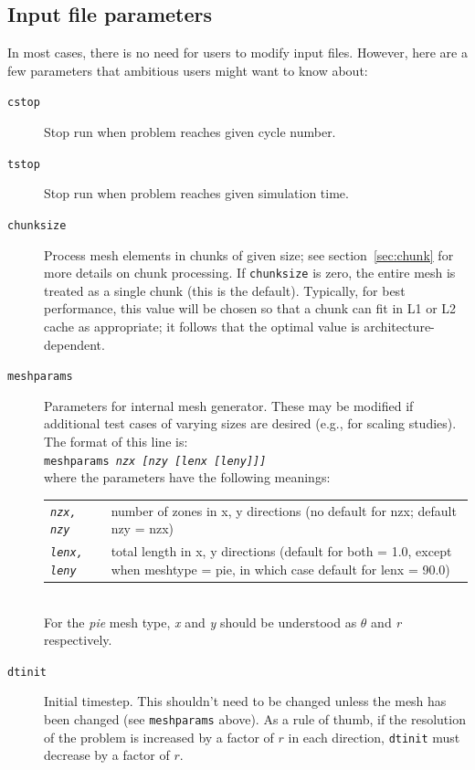 \documentclass[11pt,letterpaper]{article}
\begin{document}
\subsection{Input file parameters}

In most cases, there is no need for users to modify input files.  However,
here are a few parameters that ambitious users might want to know about:
\begin{description}
    \item[{\tt cstop}]  Stop run when problem reaches given cycle number.
    \item[{\tt tstop}]  Stop run when problem reaches given simulation time.
    \item[{\tt chunksize}]  Process mesh elements in chunks of given size;
        see section~\ref{sec:chunk} for more details on chunk processing.
        If {\tt chunksize} is zero, the entire mesh is
        treated as a single chunk (this is the default).
        Typically, for best performance, this value will be chosen so
        that a chunk can fit in L1 or L2 cache as appropriate; it
        follows that the optimal value is architecture-dependent.
    \item[{\tt meshparams}]  Parameters for internal mesh generator.
        These may be modified if additional test cases of varying sizes are
        desired (e.g., for scaling studies).  The format of this line
        is: \\
        {\tt meshparams \emph{nzx [nzy [lenx [leny]]]}} \\
        where the parameters have the following meanings: \\
        \begin{tabular}{lp{320pt}}
            {\tt\emph{nzx, nzy}} &
            number of zones in x, y directions
            (no default for nzx; default nzy = nzx) \\
            {\tt\emph{lenx, leny}} &
            total length in x, y directions
            (default for both = 1.0, except when meshtype = pie,
            in which case default for lenx = 90.0)
        \end{tabular} \\
        For the {\em pie} mesh type, {\em x} and {\em y}
        should be understood as $\theta$ and {\em r} respectively.
    \item[{\tt dtinit}]  Initial timestep.  This shouldn't need to be
        changed unless the mesh has been changed (see
        {\tt meshparams} above).  As a rule of thumb, if the resolution
        of the problem is increased by a factor of $r$ in each direction,
        {\tt dtinit} must decrease by a factor of $r$.
\end{description}
\end{document}
